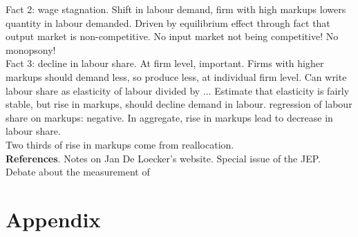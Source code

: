 \documentclass{amsart}
\theoremstyle{definition}
\theoremstyle{remark}
\numberwithin{equation}{section}
\begin{document}
Fact 2: wage stagnation. Shift in labour demand, firm with high markups lowers quantity in labour demanded. Driven by equilibrium effect through fact that output market is non-competitive. No input market not being competitive! No monopsony!\\

Fact 3: decline in labour share. At firm level, important. Firms with higher markups should demand less, so produce less, at individual firm level. Can write labour share as elasticity of labour divided by ... Estimate that elasticity is fairly stable, but rise in markups, should decline demand in labour. regression of labour share on markups: negative. In aggregate, rise in markups lead to decrease in labour share.\\

Two thirds of rise in markups come from reallocation.\\





\textbf{References}. Notes on Jan De Loecker's website. Special issue of the JEP.\\


Debate about the measurement of 

\newpage




\newpage

\section*{Appendix}
\end{document}
